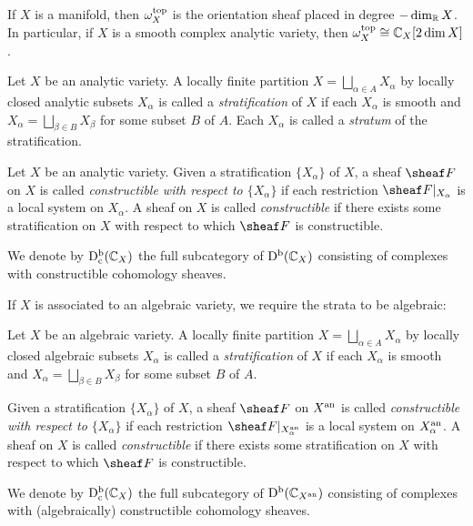 \documentclass[number-in-sections,a4paper]{notes}
\begin{document}
If $X$ is a manifold, then $\omega^{\mathrm{top}}_X$ is the orientation sheaf placed in degree $-\dim_{\mathbb{R}} X$.
In particular, if $X$ is a smooth complex analytic variety, then $\omega^{\mathrm{top}}_X \cong {\mathbb{C}}_X[2\dim X]$.

\begin{Definition}
    Let $X$ be an analytic variety.
    A locally finite partition $X = \bigsqcup_{\alpha \in A} X_\alpha$ by locally closed analytic subsets $X_\alpha$ is called a \emph{stratification} of $X$ if each $X_\alpha$ is smooth and $X_\alpha = \bigsqcup_{\beta \in B} X_\beta$ for some subset $B$ of $A$.
    Each $X_\alpha$ is called a \emph{stratum} of the stratification.
\end{Definition}

\begin{Definition}
    Let $X$ be an analytic variety.
    Given a stratification $\{X_\alpha\}$ of $X$, a sheaf $\sheaf F$ on $X$ is called \emph{constructible with respect to $\{X_\alpha\}$} if each restriction $\res{\sheaf F}{X_\alpha}$ is a local system on $X_\alpha$.
    A sheaf on $X$ is called \emph{constructible} if there exists some stratification on $X$ with respect to which $\sheaf F$ is constructible.

    We denote by $\mathrm{D}^{\mathrm{b}}_{\mathrm{c}}({\mathbb{C}}_{X})$ the full subcategory of $\mathrm{D}^{\mathrm{b}}({\mathbb{C}}_{X})$ consisting of complexes with constructible cohomology sheaves.
\end{Definition}

If $X$ is associated to an algebraic variety, we require the strata to be algebraic:

\begin{Definition}
    Let $X$ be an algebraic variety.
    A locally finite partition $X = \bigsqcup_{\alpha \in A} X_\alpha$ by locally closed algebraic subsets $X_\alpha$ is called a \emph{stratification} of $X$ if each $X_\alpha$ is smooth and $X_\alpha = \bigsqcup_{\beta \in B} X_\beta$ for some subset $B$ of $A$.

    Given a stratification $\{X_\alpha\}$ of $X$, a sheaf $\sheaf F$ on $X^{\mathrm{an}}$ is called \emph{constructible with respect to $\{X_\alpha\}$} if each restriction $\res{\sheaf F}{X_\alpha^\an}$ is a local system on $X_\alpha^{\mathrm{an}}$.
    A sheaf on $X$ is called \emph{constructible} if there exists some stratification on $X$ with respect to which $\sheaf F$ is constructible.

    We denote by $\mathrm{D}^{\mathrm{b}}_{\mathrm{c}}({\mathbb{C}}_{X})$ the full subcategory of $\mathrm{D}^{\mathrm{b}}({\mathbb{C}}_{X^{\mathrm{an}}})$ consisting of complexes with (algebraically) constructible cohomology sheaves.
\end{Definition}
\end{document}
